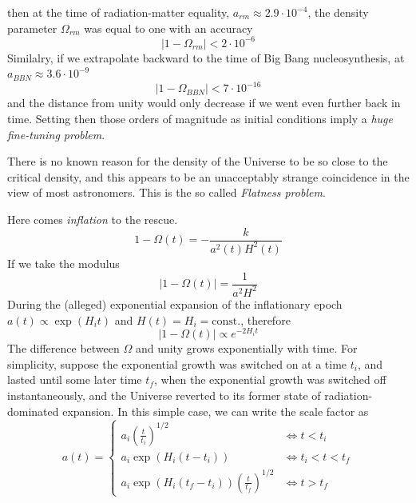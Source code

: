 then at the time of radiation-matter equality, $a_{rm}\approx 2.9\cdot 10^{-4}$, the density parameter $\Omega_{rm}$ was equal to one with an accuracy
\begin{equation*}
    |1-\Omega_{rm}|< 2\cdot 10^{-6}
\end{equation*}
Similalry, if we extrapolate backward to the time of Big Bang nucleosynthesis, at $a_{BBN} \approx 3.6\cdot 10^{-9}$
\begin{equation*}
    |1-\Omega_{BBN}|<7\cdot10^{-16}
\end{equation*}
and the distance from unity would only decrease if we went even further back in time. Setting then those orders of magnitude as initial conditions imply a \emph{huge fine-tuning problem}.
\par There is no known reason for the density of the Universe to be so close to the critical density, and this appears to be an unacceptably strange coincidence in the view of most astronomers. This is the so called \emph{Flatness problem}.
\par Here comes \emph{inflation} to the rescue.
\begin{equation*}
    1-\Omega(t) = -\frac{k}{a^{2}(t)H^{2}(t)}
\end{equation*}
If we take the modulus
\begin{equation*}
    | 1-\Omega(t)| = \frac{1}{a^{2}H^{2}}
\end{equation*}
During the (alleged) exponential expansion of the inflationary epoch $a(t)\propto \exp(H_{i}t)$ and $H(t) = H_{i} = \text{const.}$, therefore
\begin{equation*}
     | 1-\Omega(t)| \propto e^{-2H_{i}t}
\end{equation*}
The difference between $\Omega$ and unity grows exponentially with time. For simplicity, suppose the exponential growth was switched on at a time $t_{i}$, and lasted until some later time $t_{f}$, when the exponential growth was switched off instantaneously, and the Universe reverted to its former state of radiation- dominated expansion. In this simple case, we can write the scale factor as
\begin{equation*}
    a(t) = 
    \left\{
    \begin{array}{ll}
        a_{i}\left(\frac{t}{t_{i}}\right)^{1/2} & \iff t<t_{i}\\
        a_{i}\exp(H_{i}(t-t_{i})) & \iff t_{i}<t<t_{f}\\
        a_{i}\exp(H_{i}(t_{f}-t_{i}))\left(\frac{t}{t_{f}}\right)^{1/2} & \iff t>t_{f}
    \end{array}
    \right.
\end{equation*}
